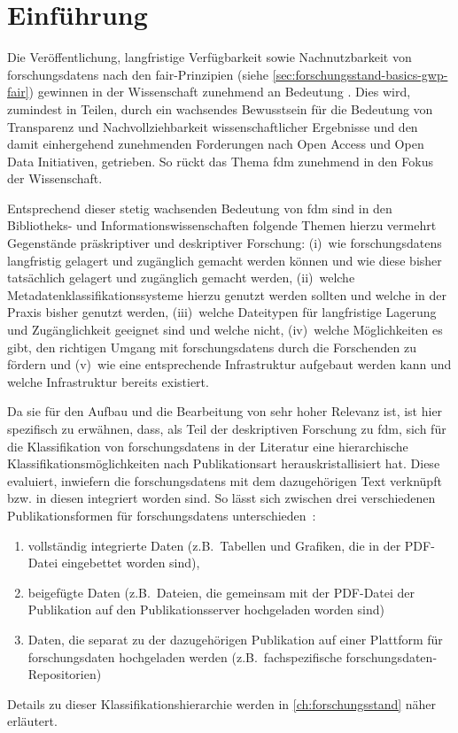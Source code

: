 \chapter{Einführung}\label{ch:einfuehrung}

Die Veröffentlichung, langfristige Verfügbarkeit sowie Nachnutzbarkeit von \glspl{forschungsdaten} nach den \gls{fair}-Prinzipien (siehe \cref{sec:forschungsstand-basics-gwp-fair}) gewinnen in der Wissenschaft zunehmend an Bedeutung \autocite{TenopirEtAl2017}.
Dies wird, zumindest in Teilen, durch ein wachsendes Bewusstsein für die Bedeutung von Transparenz und Nachvollziehbarkeit wissenschaftlicher Ergebnisse und den damit einhergehend zunehmenden Forderungen nach Open Access und Open Data Initiativen, getrieben.
So rückt das Thema \gls{fdm} zunehmend in den Fokus der Wissenschaft.

Entsprechend dieser stetig wachsenden Bedeutung von \gls{fdm} sind in den Bibliotheks- und Informationswissenschaften folgende Themen hierzu vermehrt Gegenstände präskriptiver und deskriptiver Forschung:
(i)~wie \glspl{forschungsdaten} langfristig gelagert und zugänglich gemacht werden können und wie diese bisher tatsächlich gelagert und zugänglich gemacht werden,
(ii)~welche Metadatenklassifikationssysteme hierzu genutzt werden sollten und welche in der Praxis bisher genutzt werden,
(iii)~welche Dateitypen für langfristige Lagerung und Zugänglichkeit geeignet sind und welche nicht,
(iv)~welche Möglichkeiten es gibt, den richtigen Umgang mit \glspl{forschungsdaten} durch die Forschenden zu fördern und
(v)~wie eine entsprechende Infrastruktur aufgebaut werden kann und welche Infrastruktur bereits existiert.

Da sie für den Aufbau und die Bearbeitung von sehr hoher Relevanz ist, ist hier spezifisch zu erwähnen, dass, als Teil der deskriptiven Forschung zu \gls{fdm}, sich für die Klassifikation von \glspl{forschungsdaten} in der Literatur eine hierarchische Klassifikationsmöglichkeiten nach Publikationsart herauskristallisiert hat.
Diese evaluiert, inwiefern die \glspl{forschungsdaten} mit dem dazugehörigen Text verknüpft bzw. in diesen integriert worden sind.
So lässt sich zwischen drei verschiedenen Publikationsformen für \glspl{forschungsdaten} unterschieden~\autocites[S.~36ff.]{ReillyEtAl2011}:
\begin{enumerate}
    \item vollständig integrierte Daten (z.B.~Tabellen und Grafiken, die in der PDF-Datei eingebettet worden sind),
    \item beigefügte Daten (z.B.~Dateien, die gemeinsam mit der PDF-Datei der Publikation auf den Publikationsserver hochgeladen worden sind)
    \item Daten, die separat zu der dazugehörigen Publikation auf einer Plattform für \gls{forschungsdaten} hochgeladen werden (z.B.~fachspezifische \gls{forschungsdaten}-Repositorien)
\end{enumerate}
Details zu dieser Klassifikationshierarchie werden in \cref{ch:forschungsstand} näher erläutert.

